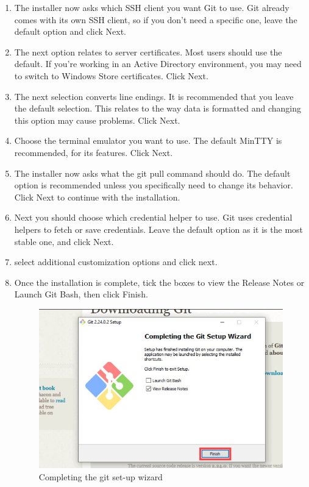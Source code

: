 \documentclass[12pt]{article}
\begin{document}
\begin{enumerate}
\item The installer now asks which SSH client you want Git to use. Git already comes with its own SSH client, so if you don't need a specific one, leave the default option and click Next.

\item The next option relates to server certificates. Most users should use the default. If you’re working in an Active Directory environment, you may need to switch to Windows Store certificates. Click Next.

\item The next selection converts line endings. It is recommended that you leave the default selection. This relates to the way data is formatted and changing this option may cause problems. Click Next.

\item Choose the terminal emulator you want to use. The default MinTTY is recommended, for its features. Click Next.

\item  The installer now asks what the git pull command should do. The default option is recommended unless you specifically need to change its behavior. Click Next to continue with the installation.

\item Next you should choose which credential helper to use. Git uses credential helpers to fetch or save credentials. Leave the default option as it is the most stable one, and click Next.

\item select additional customization options and click next.

\item Once the installation is complete, tick the boxes to view the Release Notes or Launch Git Bash, then click Finish.

\begin{figure}[H]
\centering
\includegraphics[scale=0.7]{gitinstall6}
\caption{Completing the git set-up wizard}
\label{gitinstall6}
\vspace{0.6\baselineskip}
\end{figure}

\end{enumerate}
\end{document}
